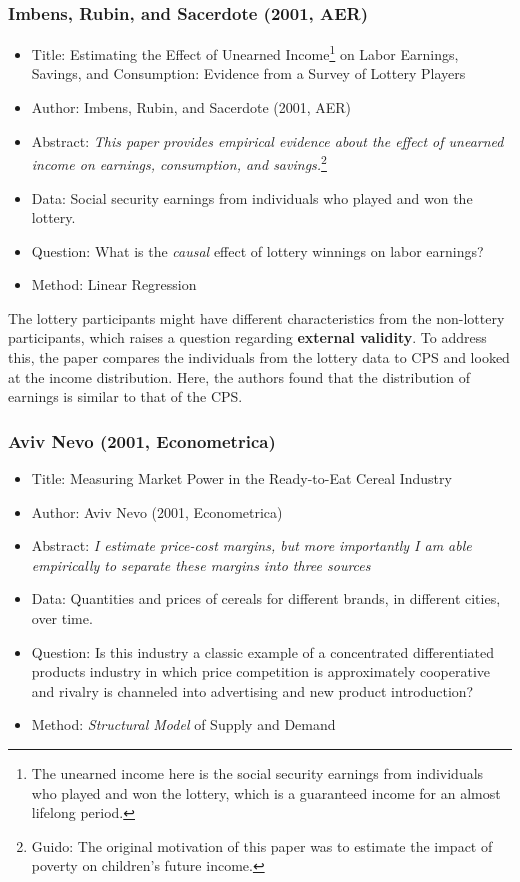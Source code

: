\subsubsection{Imbens, Rubin, and Sacerdote (2001, AER)}

\begin{itemize}
    \item Title: Estimating the Effect of Unearned Income\footnote{The unearned income here is the social security earnings from individuals who played and won the lottery, which is a guaranteed income for an almost lifelong period.} on Labor Earnings, Savings, and Consumption: Evidence from a Survey of Lottery Players
    \item Author: Imbens, Rubin, and Sacerdote (2001, AER)
    \item Abstract: \textit{This paper provides empirical evidence about the effect of unearned income on earnings, consumption, and savings.}\footnote{Guido: The original motivation of this paper was to estimate the impact of poverty on children's future income.}
    \item Data: Social security earnings from individuals who played and won the lottery.
    \item Question: What is the \textit{causal} effect of lottery winnings on labor earnings?
    \item Method: Linear Regression
\end{itemize}


The lottery participants might have different characteristics from the non-lottery participants, which raises a question regarding \textbf{external validity}.
To address this, the paper compares the individuals from the lottery data to CPS and looked at the income distribution. Here, the authors found that the distribution of earnings is similar to that of the CPS.

\subsubsection{Aviv Nevo (2001, Econometrica)}

\begin{itemize}
    \item Title: Measuring Market Power in the Ready-to-Eat Cereal Industry
    \item Author: Aviv Nevo (2001, Econometrica)
    \item Abstract: \textit{I estimate price-cost margins, but more importantly I am able empirically to separate these margins into three sources}
    \item Data: Quantities and prices of cereals for different brands, in different cities, over time.
    \item Question:  Is this industry a classic example of a concentrated differentiated products industry in which price competition is approximately cooperative and rivalry is channeled into advertising and new product introduction?
    \item Method: \textit{Structural Model} of Supply and Demand
\end{itemize}


